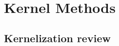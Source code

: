\documentclass{article}
\theoremstyle{plain}
\theoremstyle{definition}
\begin{document}


\section{\large Kernel Methods}

\subsection{Kernelization review}
\end{document}
